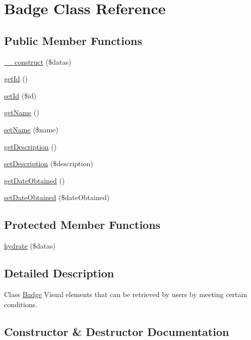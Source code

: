 \hypertarget{classBadge}{}\section{Badge Class Reference}
\label{classBadge}
\subsection*{Public Member Functions}
\begin{DoxyCompactItemize}
\item 
\hyperlink{classBadge_a22bdc4f47bfaf9d7630ed3ed5a7c0b46}{\+\_\+\+\_\+construct} (\$datas)
\item 
\hyperlink{classBadge_a206349087c7b423daa4964318886ccc3}{get\+Id} ()
\item 
\hyperlink{classBadge_aa48f5e2fe363acf83552dd5957c75fd5}{set\+Id} (\$id)
\item 
\hyperlink{classBadge_a08e0c102d48aed880562403af8303709}{get\+Name} ()
\item 
\hyperlink{classBadge_a3f66fcec8d521a4e1426283c44a6fb86}{set\+Name} (\$name)
\item 
\hyperlink{classBadge_adf6b3856f9ced3c4e4d6e97a18168eaf}{get\+Description} ()
\item 
\hyperlink{classBadge_abaa93dae83aa50e39c068221b47ac4f8}{set\+Description} (\$description)
\item 
\hyperlink{classBadge_a26b32b8cf6d1a7c905526fdb012a7292}{get\+Date\+Obtained} ()
\item 
\hyperlink{classBadge_a99485c712f80a0b22e9e775519b1f250}{set\+Date\+Obtained} (\$date\+Obtained)
\end{DoxyCompactItemize}
\subsection*{Protected Member Functions}
\begin{DoxyCompactItemize}
\item 
\hyperlink{classBadge_a3b8f16049d6e5d50ae21276421a41508}{hydrate} (\$datas)
\end{DoxyCompactItemize}


\subsection{Detailed Description}
Class \hyperlink{classBadge}{Badge} Visual elements that can be retrieved by users by meeting certain conditions. 

\subsection{Constructor \& Destructor Documentation}
\mbox{\label{classBadge_a22bdc4f47bfaf9d7630ed3ed5a7c0b46}} 

